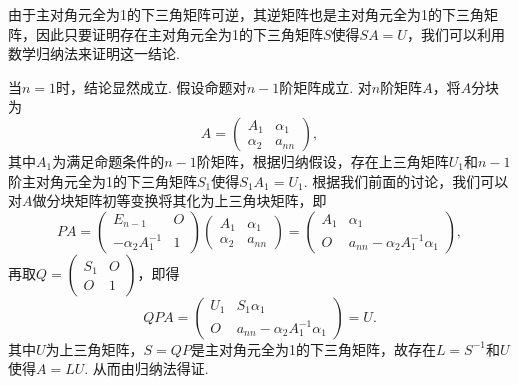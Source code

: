 \begin{solution}
    由于主对角元全为1的下三角矩阵可逆，其逆矩阵也是主对角元全为1的下三角矩阵，因此只要证明存在主对角元全为1的下三角矩阵$S$使得$SA=U$，我们可以利用数学归纳法来证明这一结论.

    当$n=1$时，结论显然成立. 假设命题对$n-1$阶矩阵成立. 对$n$阶矩阵$A$，将$A$分块为
    \[A=\begin{pmatrix}
            A_1 & \alpha_1 \\ \alpha_2 & a_{nn}
        \end{pmatrix},\]
    其中$A_1$为满足命题条件的$n-1$阶矩阵，根据归纳假设，存在上三角矩阵$U_1$和$n-1$阶主对角元全为1的下三角矩阵$S_1$使得$S_1A_1=U_1$. 根据我们前面的讨论，我们可以对$A$做分块矩阵初等变换将其化为上三角块矩阵，即
    \[PA=\begin{pmatrix}
            E_{n-1} & O \\ -\alpha_2A_1^{-1} & 1
        \end{pmatrix}\begin{pmatrix}
            A_1 & \alpha_1 \\ \alpha_2 & a_{nn}
        \end{pmatrix}=\begin{pmatrix}
            A_1 & \alpha_1 \\ O & a_{nn}-\alpha_2A_1^{-1}\alpha_1
        \end{pmatrix},\]
    再取$Q=\begin{pmatrix}
            S_1 & O \\ O & 1
        \end{pmatrix}$，即得
    \[QPA=\begin{pmatrix}
            U_1 & S_1\alpha_1 \\ O & a_{nn}-\alpha_2A_1^{-1}\alpha_1
        \end{pmatrix}=U.\]
    其中$U$为上三角矩阵，$S=QP$是主对角元全为1的下三角矩阵，故存在$L=S^{-1}$和$U$使得$A=LU$. 从而由归纳法得证.
\end{solution}


